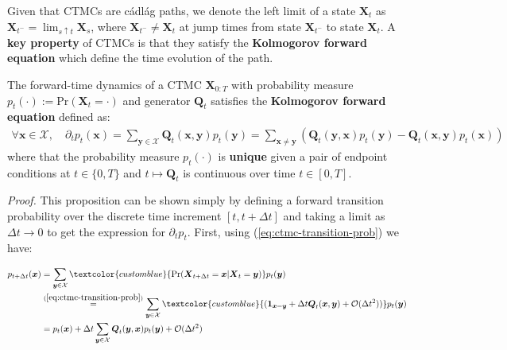 \documentclass{article}
\newcommand{\boldtext}[1]{\textbf{\textcolor{MyGreen}{#1}}}
\newcommand{\bluetext}[1]{\textcolor{customblue}{#1}}
\begin{document}
Given that CTMCs are cádlág paths, we denote the left limit of a state $\boldsymbol{X}_t$ as $\boldsymbol{X}_{t^-}=\lim_{s\uparrow t}\boldsymbol{X}_s$, where $\boldsymbol{X}_{t^-}\neq \boldsymbol{X}_t$ at jump times from state $\boldsymbol{X}_{t^-}$ to state $\boldsymbol{X}_t$. A \textbf{key property} of CTMCs is that they satisfy the \boldtext{Kolmogorov forward equation} which define the time evolution of the path.

\begin{lemma}\label{lemma:ctmc-kolmogorov-fwd}
 The forward-time dynamics of a CTMC $\boldsymbol{X}_{0:T}$ with probability measure $p_t(\cdot):=\text{Pr}(\boldsymbol{X}_t=\cdot)$ and generator $\boldsymbol{Q}_t$ satisfies the \textbf{Kolmogorov forward equation} defined as:
 \begin{align}
     \forall \boldsymbol{x}\in \mathcal{X}, \quad \partial_tp_t(\boldsymbol{x})=\sum_{\boldsymbol{y}\in \mathcal{X}}\boldsymbol{Q}_t(\boldsymbol{x},\boldsymbol{y})p_t(\boldsymbol{y})=\sum_{\boldsymbol{x}\neq\boldsymbol{y}}\left(\boldsymbol{Q}_t(\boldsymbol{y}, \boldsymbol{x})p_t(\boldsymbol{y})-\boldsymbol{Q}_t(\boldsymbol{x},\boldsymbol{y})p_t(\boldsymbol{x})\right)\label{eq:ctmc-kolmogorov-fwd}
 \end{align}
 where that the probability measure $p_t(\cdot)$ is \textbf{unique} given a pair of endpoint conditions at $t\in \{0,T\}$ and $t\mapsto \boldsymbol{Q}_t$ is continuous over time $t\in [0,T]$.
\end{lemma}
\textit{Proof.} This proposition can be shown simply by defining a forward transition probability over the discrete time increment $[t,t+\Delta t]$ and taking a limit as $\Delta t\to 0$ to get the expression for $\partial_tp_t$. First, using (\ref{eq:ctmc-transition-prob}) we have:
\begin{small}
\begin{align}
    p_{t+\Delta t}(\boldsymbol{x}) &=\sum_{\boldsymbol{y}\in \mathcal{X}}\bluetext{\text{Pr}(\boldsymbol{X}_{t+\Delta t}=\boldsymbol{x}|\boldsymbol{X}_t=\boldsymbol{y})}p_t(\boldsymbol{y})\nonumber\\
    &\overset{(\ref{eq:ctmc-transition-prob})}{=}\sum_{\boldsymbol{y}\in \mathcal{X}}\bluetext{(\boldsymbol{1}_{\boldsymbol{x}=\boldsymbol{y}}+\Delta t\boldsymbol{Q}_t(\boldsymbol{x},\boldsymbol{y})+\mathcal{O}(\Delta t^2) )}p_t(\boldsymbol{y})\nonumber\\
    &=p_t(\boldsymbol{x})+\Delta t\sum_{\boldsymbol{y}\in \mathcal{X}}\boldsymbol{Q}_t(\boldsymbol{y}, \boldsymbol{x})p_t(\boldsymbol{y})+\mathcal{O}(\Delta t^2)
\end{align}
\end{small}
\end{document}
